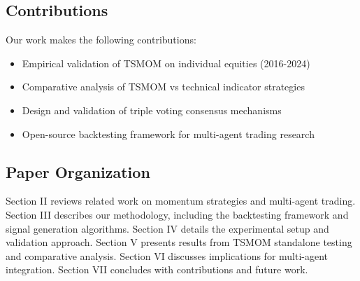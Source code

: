 \subsection{Contributions}

Our work makes the following contributions:

\begin{itemize}
    \item Empirical validation of TSMOM on individual equities (2016-2024)
    \item Comparative analysis of TSMOM vs technical indicator strategies
    \item Design and validation of triple voting consensus mechanisms
    \item Open-source backtesting framework for multi-agent trading research
\end{itemize}

\subsection{Paper Organization}

Section II reviews related work on momentum strategies and multi-agent trading. Section III describes our methodology, including the backtesting framework and signal generation algorithms. Section IV details the experimental setup and validation approach. Section V presents results from TSMOM standalone testing and comparative analysis. Section VI discusses implications for multi-agent integration. Section VII concludes with contributions and future work.

